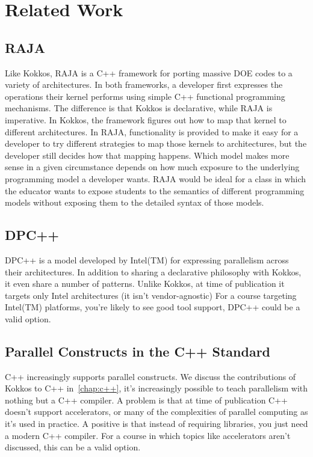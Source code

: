 \section{Related Work}\label{chap:related}
\subsection{RAJA}
Like Kokkos, RAJA is a C++ framework for porting massive DOE codes to a variety of architectures. In both frameworks, a developer first expresses the operations their kernel performs using simple C++ functional programming mechanisms. The difference is that Kokkos is declarative, while RAJA is imperative. In Kokkos, the framework figures out how to map that kernel to different architectures. In RAJA, functionality is provided to make it easy for a developer to try different strategies to map those kernels to architectures, but the developer still decides how that mapping happens. Which model makes more sense in a given circumstance depends on how much exposure to the underlying programming model a developer wants. RAJA would be ideal for a class in which the educator wants to expose students to the semantics of different programming models without exposing them to the detailed syntax of those models.
\subsection{DPC++}
DPC++ is a model developed by Intel(TM) for expressing parallelism across their architectures. In addition to sharing a declarative philosophy with Kokkos, it even share a number of patterns. Unlike Kokkos, at time of publication it targets only Intel architectures (it isn't vendor-agnostic) For a course targeting Intel(TM) platforms, you're likely to see good tool support, DPC++ could be a valid option.
\subsection{Parallel Constructs in the C++ Standard}
C++ increasingly supports parallel constructs. We discuss the contributions of Kokkos to C++ in~\ref{chap:c++}, it's increasingly possible to teach parallelism with nothing but a C++ compiler. A problem is that at time of publication C++ doesn't support accelerators, or many of the complexities of parallel computing as it's used in practice. A positive is that instead of requiring libraries, you just need a modern C++ compiler. For a course in which topics like accelerators aren't discussed, this can be a valid option.


